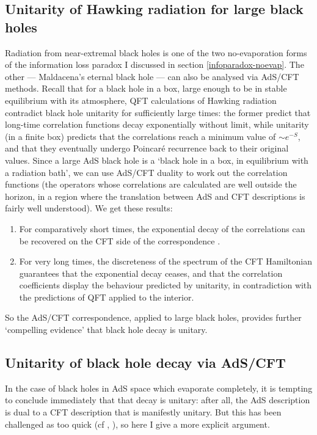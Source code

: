 \documentclass[12pt]{article}
\begin{document}
\subsection{Unitarity of Hawking radiation for large black holes}\label{eternal-unitarity}

Radiation from near-extremal black holes is one of the two no-evaporation forms of the information loss paradox I discussed in section \ref{infoparadox-noevap}. The other --- Maldacena's eternal black hole --- can also be analysed via AdS/CFT methods. Recall that for a black hole in a box, large enough to be in stable equilibrium with its atmosphere, QFT calculations of Hawking radiation contradict black hole unitarity for sufficiently large times: the former predict that long-time correlation functions decay exponentially without limit, while unitarity (in a finite box) predicts that the correlations reach a minimum value of $\sim e^{-S}$, and that they eventually undergo Poincar\'{e} recurrence back to their original values. Since a large AdS black hole is a `black hole in a box, in equilibrium with a radiation bath', we can use AdS/CFT duality to work out the correlation functions (the operators whose correlations are calculated are well outside the horizon, in a region where the translation between AdS and CFT descriptions is fairly well understood). We get these results:
\begin{enumerate}
\item For comparatively short times, the exponential decay of the correlations can be recovered on the CFT side of the correspondence \cite{pr-infalling}.
\item For very long times, the discreteness of the spectrum of the CFT Hamiltonian guarantees that the exponential decay ceases, and that the correlation coefficients display the behaviour predicted by unitarity, in contradiction with the predictions of QFT applied to the interior. \cite{maldacena-eternal}
\end{enumerate}
So the AdS/CFT correspondence, applied to large black holes, provides further `compelling evidence' \cite[p.92]{harlowreview} that black hole decay is unitary.

\subsection{Unitarity of black hole decay via AdS/CFT}\label{unitarity-of-decay}

In the case of black holes in AdS space which evaporate completely, it is tempting to conclude immediately that that decay is unitary: after all, the AdS description is dual to a CFT description that is manifestly unitary. But this has been challenged as too quick (cf , ), so here I give a more explicit argument. 
\end{document}
